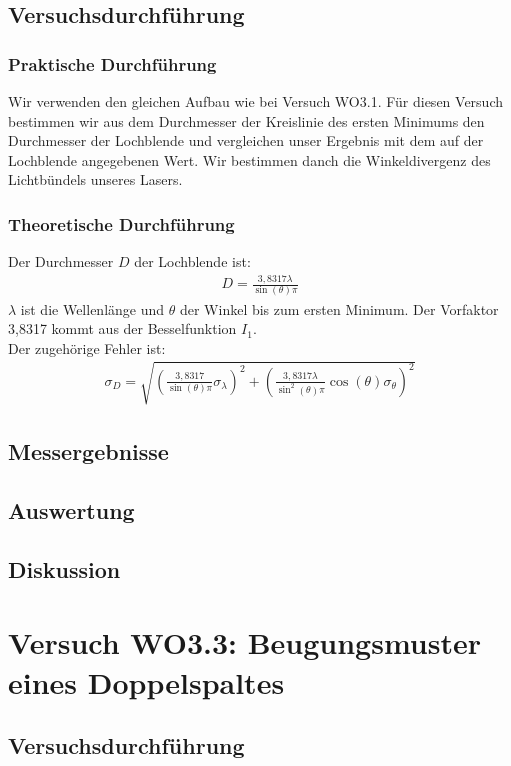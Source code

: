 \documentclass[12pt]{scrartcl}
\begin{document}
\subsection{Versuchsdurchführung}

\subsubsection{Praktische Durchführung}
Wir verwenden den gleichen Aufbau wie bei Versuch WO3.1. Für diesen Versuch bestimmen wir aus dem Durchmesser der Kreislinie des ersten Minimums den Durchmesser der Lochblende und vergleichen unser Ergebnis mit dem auf der Lochblende angegebenen Wert. Wir bestimmen danch die Winkeldivergenz des Lichtbündels unseres Lasers.
\subsubsection{Theoretische Durchführung}
Der Durchmesser $D$ der Lochblende ist:
\begin{align}
D = \frac{3,8317 \lambda}{\sin(\theta)\pi}
\end{align}
$\lambda$ ist die Wellenlänge und $\theta$ der Winkel bis zum ersten Minimum. Der Vorfaktor 3,8317 kommt aus der Besselfunktion $I_1$.\\
Der zugehörige Fehler ist:
\begin{align}
\sigma_D = \sqrt{
\left(\frac{3,8317}{\sin(\theta)\pi}\sigma_\lambda \right)^2+
\left(\frac{3,8317\lambda}{\sin^2(\theta)\pi}\cos(\theta)
\sigma_\theta \right)^2}
\end{align}
\subsection{Messergebnisse}
\subsection{Auswertung}
\subsection{Diskussion}

\section{Versuch WO3.3: Beugungsmuster eines Doppelspaltes}
\subsection{Versuchsdurchführung}
\end{document}
